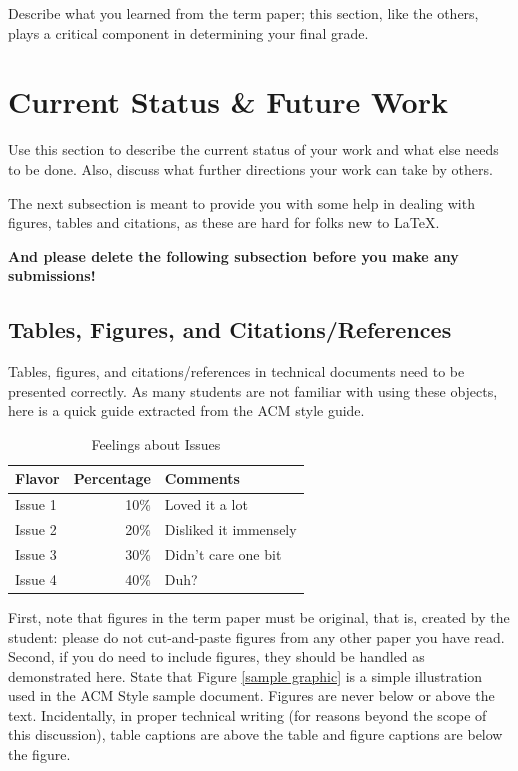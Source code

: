 \documentclass{sig-alternate}
\begin{document}
Describe what you learned from the term paper;
this section, like the others, plays a critical component in
determining your final grade.

\section{Current Status \& Future Work}
\label{current status and future work}

Use this section to describe the current status of your work
and what else needs to be done. Also, discuss what further directions
your work can take by others.



The next subsection is meant to provide you with some help
in dealing with figures, tables and citations, as these are hard for
folks new to \LaTeX. 

{\bf And please delete the following subsection before you make any submissions!}

\subsection{Tables, Figures, and Citations/References}

Tables, figures, and citations/references in technical
documents need to be presented correctly. As many students
are not familiar with using these objects, here is a quick
guide extracted from the ACM style guide.

\begin{table}
\centering
\caption{Feelings about Issues}
\begin{tabular}{|l|r|l|} \hline
Flavor&Percentage&Comments\\ \hline
Issue 1 &  10\% & Loved it a lot\\ \hline
Issue 2 &  20\% & Disliked it immensely\\ \hline
Issue 3 &  30\% & Didn't care one bit\\ \hline
Issue 4 &  40\% & Duh?\\ \hline
\end{tabular}
\end{table}


First, note that figures in the term paper must be original,
that is, created by the student: please do not cut-and-paste
figures from any other paper you have read. Second, if you
do need to include figures, they should be handled as
demonstrated here. State that Figure \ref{sample graphic} is
a simple illustration used in the ACM Style sample
document. Figures are never below or above the
text. Incidentally, in proper technical writing (for reasons
beyond the scope of this discussion), table captions are
above the table and figure captions are below the figure.
\end{document}
